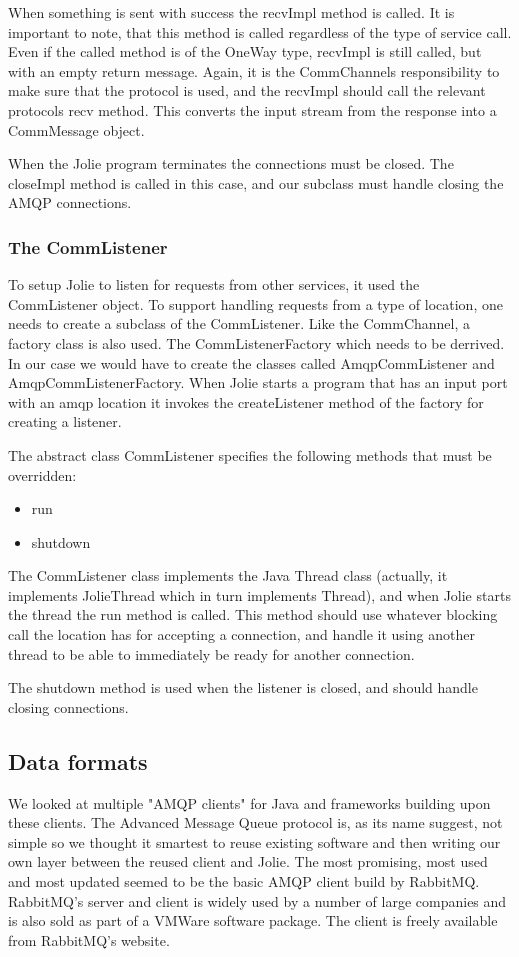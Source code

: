 When something is sent with success the recvImpl method is called. It is important to note, that this method is called regardless of the type of service call. Even if the called method is of the OneWay type, recvImpl is still called, but with an empty return message. Again, it is the CommChannels responsibility to make sure that the protocol is used, and the recvImpl should call the relevant protocols recv method. This converts the input stream from the response into a CommMessage object.

When the Jolie program terminates the connections must be closed. The closeImpl method is called in this case, and our subclass must handle closing the AMQP connections.

\subsubsection{The CommListener}
To setup Jolie to listen for requests from other services, it used the CommListener object. To support handling requests from a type of location, one needs to create a subclass of the CommListener. Like the CommChannel, a factory class is also used. The CommListenerFactory which needs to be derrived. In our case we would have to create the classes called AmqpCommListener and AmqpCommListenerFactory. When Jolie starts a program that has an input port with an amqp location it invokes the createListener method of the factory for creating a listener.

The abstract class CommListener specifies the following methods that must be overridden:
\begin{itemize}
  \item{run}
  \item{shutdown}
\end{itemize}

The CommListener class implements the Java Thread class (actually, it implements JolieThread which in turn implements Thread), and when Jolie starts the thread the run method is called. This method should use whatever blocking call the location has for accepting a connection, and handle it using another thread to be able to immediately be ready for another connection.

The shutdown method is used when the listener is closed, and should handle closing connections.

\subsection{Data formats}
\label{subsec:Data formats}
We looked at multiple "AMQP clients" for Java and frameworks building upon these clients. The Advanced Message Queue protocol is, as its name suggest, not simple so we thought it smartest to reuse existing software and then writing our own layer between the reused client and Jolie. The most promising, most used and most updated seemed to be the basic AMQP client build by RabbitMQ\cite{RabbitMqClient}. RabbitMQ's server and client is widely used by a number of large companies and is also sold as part of a VMWare software package\cite{vFabric}. The client is freely available from RabbitMQ's website.

